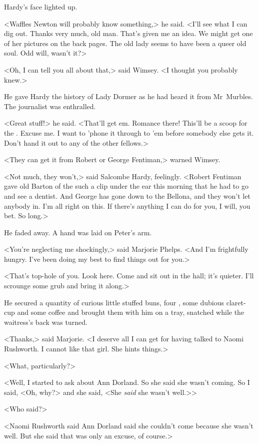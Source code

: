 Hardy's face lighted up.

<Waffles Newton will probably know something,> he said. <I'll see what I can dig out. Thanks very much, old man. That's given me an idea. We might get one of her pictures on the back pages. The old lady seems to have been a queer old soul. Odd will, wasn't it?>

<Oh, I can tell you all about that,> said Wimsey. <I thought you probably knew.>

He gave Hardy the history of Lady Dormer as he had heard it from Mr~Murbles. The journalist was enthralled.

<Great stuff!> he said. <That'll get em. Romance there! This'll be a scoop for the . Excuse me. I want to 'phone it through to 'em before somebody else gets it. Don't hand it out to any of the other fellows.>

<They can get it from Robert or George Fentiman,> warned Wimsey.

<Not much, they won't,> said Salcombe Hardy, feelingly. <Robert Fentiman gave old Barton of the  such a clip under the ear this morning that he had to go and see a dentist. And George has gone down to the Bellona, and they won't let anybody in. I'm all right on this. If there's anything I can do for you, I will, you bet. So long.>

He faded away. A hand was laid on Peter's arm.

<You're neglecting me shockingly,> said Marjorie Phelps. <And I'm frightfully hungry. I've been doing my best to find things out for you.>

<That's top-hole of you. Look here. Come and sit out in the hall; it's quieter. I'll scrounge some grub and bring it along.>

He secured a quantity of curious little stuffed buns, four , some dubious claret-cup and some coffee and brought them with him on a tray, snatched while the waitress's back was turned.

<Thanks,> said Marjorie. <I deserve all I can get for having talked to Naomi Rushworth. I cannot like that girl. She hints things.>

<What, particularly?>

<Well, I started to ask about Ann Dorland. So she said she wasn't coming. So I said, <Oh, why?> and she said, <She \emph{said} she wasn't well.>>

<Who said?>

<Naomi Rushworth said Ann Dorland said she couldn't come because she wasn't well. But she said that was only an excuse, of course.>

